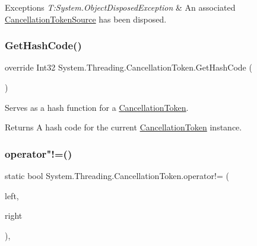 \begin{DoxyExceptions}{Exceptions}
{\em T\+:\+System.\+Object\+Disposed\+Exception} & An associated \hyperlink{}{Cancellation\+Token\+Source} has been disposed.\\
\hline
\end{DoxyExceptions}
\mbox{\label{struct_system_1_1_threading_1_1_cancellation_token_ae540b6a9c1fa9814d58e69a1703fbeef}} 
\subsubsection{\texorpdfstring{Get\+Hash\+Code()}{GetHashCode()}}
{\footnotesize\ttfamily override Int32 System.\+Threading.\+Cancellation\+Token.\+Get\+Hash\+Code (\begin{DoxyParamCaption}{ }\end{DoxyParamCaption})\hspace{0.3cm}{\ttfamily [inline]}}



Serves as a hash function for a \hyperlink{}{Cancellation\+Token}. 

\begin{DoxyReturn}{Returns}
A hash code for the current \hyperlink{}{Cancellation\+Token} instance.
\end{DoxyReturn}
\mbox{\label{struct_system_1_1_threading_1_1_cancellation_token_a091d6753aa02ca1f255a7b7e919be086}} 
\subsubsection{\texorpdfstring{operator"!=()}{operator!=()}}
{\footnotesize\ttfamily static bool System.\+Threading.\+Cancellation\+Token.\+operator!= (\begin{DoxyParamCaption}\item[{\hyperlink{struct_system_1_1_threading_1_1_cancellation_token}{Cancellation\+Token}}]{left,  }\item[{\hyperlink{struct_system_1_1_threading_1_1_cancellation_token}{Cancellation\+Token}}]{right }\end{DoxyParamCaption})\hspace{0.3cm}{\ttfamily [inline]}, {\ttfamily [static]}}



